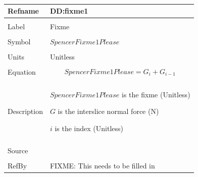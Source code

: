 \documentclass[12pt]{article}
\begin{document}
~\newline
\noindent \begin{minipage}{\textwidth}
\begin{tabular}{p{} p{}}
\toprule \textbf{Refname} & \textbf{DD:fixme1}
\label{DD:fixme1}
\\ \midrule \\
Label & Fixme
\\ \midrule \\
Symbol & $SpencerFixme1Please$
\\ \midrule \\
Units & Unitless
\\ \midrule \\
Equation & \begin{dmath}
           SpencerFixme1Please=G_{i}+G_{i-1}
           \end{dmath}
\\ \midrule \\
Description & \begin{symbDescription}
              \item{$SpencerFixme1Please$ is the fixme (Unitless)}
              \item{$G$ is the interslice normal force (N)}
              \item{$i$ is the index (Unitless)}
              \end{symbDescription}
\\ \midrule \\
Source & 
\\ \midrule \\
RefBy & FIXME: This needs to be filled in
\\ \bottomrule \end{tabular}
\end{minipage}\\
~\newline
\end{document}
